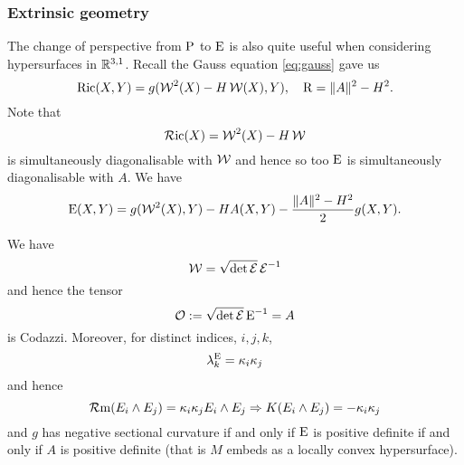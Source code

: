 \documentclass[a4paper, 12pt]{amsart}
\begin{document}
\subsubsection{Extrinsic geometry}
The change of perspective from \(\operatorname{P}\) to \(\operatorname{E}\) is also quite useful when considering hypersurfaces in \(\mathbb{R}^{3,1}\). Recall the Gauss equation \eqref{eq:gauss} gave us
\[
\operatorname{Ric}(X, Y) = g(\operatorname{\mathcal{W}}^2(X) - H \operatorname{\mathcal{W}}(X), Y), \quad \operatorname{R} = \|A\|^2 - H^2.
\]
Note that
\[
\operatorname{\mathcal{R}ic} (X) = \operatorname{\mathcal{W}}^2(X) - H \operatorname{\mathcal{W}}
\]
is simultaneously diagonalisable with \(\operatorname{\mathcal{W}}\) and hence so too \(\operatorname{E}\) is simultaneously diagonalisable with \(A\). We have
\begin{equation}
\label{eq:ein_extrinsic}
\operatorname{E} (X, Y) = g(\operatorname{\mathcal{W}}^2(X), Y) - H A(X, Y) - \frac{\|A\|^2 - H^2}{2} g (X, Y).
\end{equation}
\begin{lemma}
\label{lem:ein_W}
We have
\[
\operatorname{\mathcal{W}} = \sqrt{\det \operatorname{\mathcal{E}}} \operatorname{\mathcal{E}}^{-1}
\]
and hence the tensor
\[
\operatorname{\mathcal{O}} := \sqrt{\det \operatorname{\mathcal{E}}} \operatorname{E}^{-1} = A
\]
is Codazzi. Moreover, for distinct indices, \(i,j,k\),
\[
\lambda^{\operatorname{E}}_k = \kappa_i\kappa_j
\]
and hence
\[
\operatorname{\mathcal{R}m} (E_i \wedge E_j) = \kappa_i \kappa_j E_i \wedge E_j \Rightarrow K(E_i \wedge E_j) = -\kappa_i \kappa_j
\]
and \(g\) has negative sectional curvature if and only if \(\operatorname{E}\) is positive definite if and only if \(A\) is positive definite (that is \(M\) embeds as a locally convex hypersurface).
\end{lemma}
\end{document}
